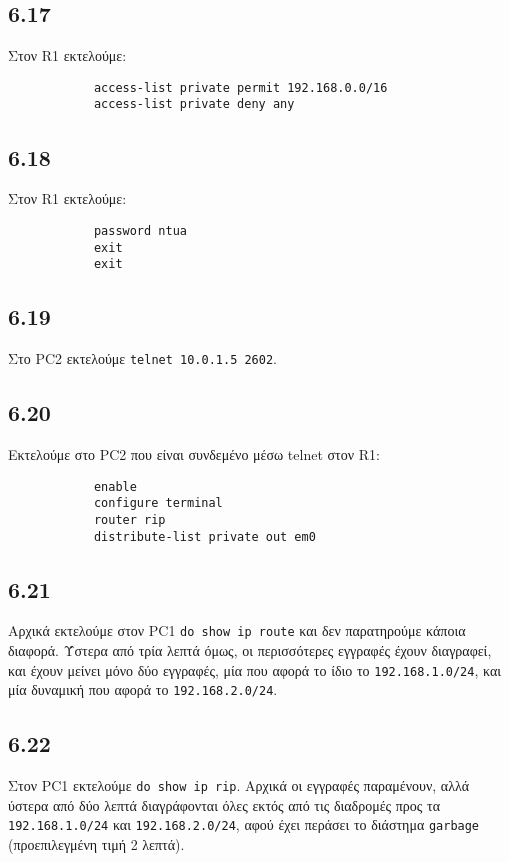 \documentclass[a4paper, 12pt]{article}
\begin{document}
	\subsection*{6.17}
		Στον R1 εκτελούμε:
		
		\begin{verbatim}
			access-list private permit 192.168.0.0/16
			access-list private deny any
		\end{verbatim}

	\subsection*{6.18}
		Στον R1 εκτελούμε:
		
		\begin{verbatim}
			password ntua
			exit
			exit
		\end{verbatim}

	\subsection*{6.19} 
		Στο PC2 εκτελούμε \verb|telnet 10.0.1.5 2602|. 

	\subsection*{6.20}
		Εκτελούμε στο PC2 που είναι συνδεμένο μέσω telnet στον R1:
		
		\begin{verbatim}
			enable
			configure terminal
			router rip
			distribute-list private out em0
		\end{verbatim}
		
	\subsection*{6.21}
		Αρχικά εκτελούμε στον PC1 \verb|do show ip route| και δεν παρατηρούμε κάποια διαφορά. Ύστερα από τρία λεπτά όμως, οι περισσότερες εγγραφές έχουν διαγραφεί, και έχουν μείνει μόνο δύο εγγραφές, μία που αφορά το ίδιο το \verb|192.168.1.0/24|, και μία δυναμική που αφορά το \verb|192.168.2.0/24|.

	\subsection*{6.22}
		Στον PC1 εκτελούμε \verb|do show ip rip|. Αρχικά οι εγγραφές παραμένουν, αλλά ύστερα από δύο λεπτά διαγράφονται όλες εκτός από τις διαδρομές προς τα \verb|192.168.1.0/24| και \verb|192.168.2.0/24|, αφού έχει περάσει το διάστημα \verb|garbage| (προεπιλεγμένη τιμή 2 λεπτά).
\end{document}
